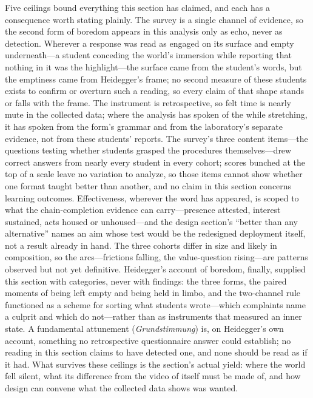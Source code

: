 Five ceilings bound everything this section has claimed, and each has
a consequence worth stating plainly. The survey is a single channel of
evidence, so the second form of boredom appears in this analysis only
as echo, never as detection. Wherever a response was read as engaged
on its surface and empty underneath---a student conceding the world's
immersion while reporting that nothing in it was the highlight---the
surface came from the student's words, but the emptiness came from
Heidegger's frame; no second measure of these students exists to
confirm or overturn such a reading, so every claim of that shape
stands or falls with the frame. The instrument is
retrospective, so felt time is nearly mute in the collected data;
where the analysis has spoken of the while stretching, it has spoken
from the form's grammar and from the laboratory's separate evidence,
not from these students' reports. The survey's three content
items---the questions testing whether students grasped the procedures
themselves---drew correct answers from nearly every student in every
cohort; scores bunched at the top of a scale leave no variation to
analyze, so those items cannot show whether one format taught better
than another, and no claim in this section concerns learning outcomes.
Effectiveness,
wherever the word has appeared, is scoped to what the chain-completion
evidence can carry---presence attested, interest sustained, acts
housed or unhoused---and the design section's ``better than any
alternative'' names an aim whose test would be the redesigned
deployment itself, not a result already in hand. The three cohorts
differ in size and likely in composition, so the arcs---frictions
falling, the value-question rising---are patterns observed but not yet
definitive. Heidegger's account of boredom, finally, supplied this section
with categories, never with findings: the three forms, the paired
moments of being left empty and being held in limbo, and the
two-channel rule functioned as a scheme for sorting what students
wrote---which complaints name a culprit and which do not---rather than
as instruments that measured an inner state. A fundamental attunement
(\textit{Grundstimmung}) is, on Heidegger's own account, something no
retrospective questionnaire answer could establish; no reading in this
section claims to have detected one, and none should be read as if it
had. What survives these
ceilings is the section's actual yield: where the world fell silent,
what its difference from the video of itself must be made of, and how
design can convene what the collected data shows was wanted.

